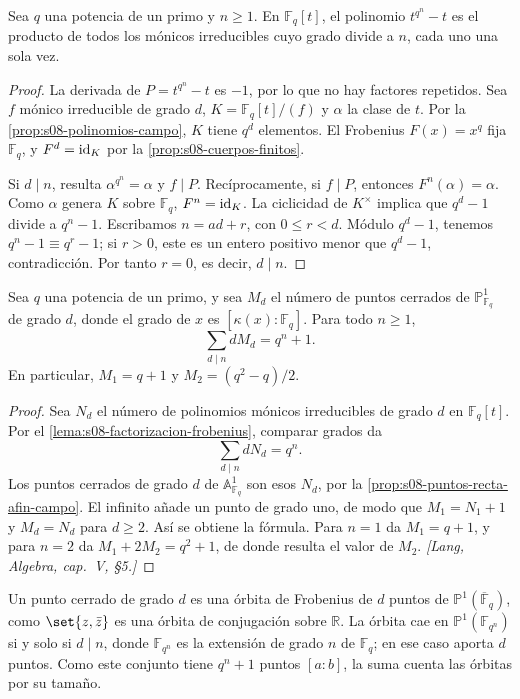 \begin{lema}[Factorización de $t^{q^n}-t$]
\label{lema:s08-factorizacion-frobenius}
Sea $q$ una potencia de un primo y $n\geq1$. En $\mathbb F_q[t]$, el polinomio $t^{q^n}-t$ es el producto de todos los mónicos irreducibles cuyo grado divide a $n$, cada uno una sola vez.
\end{lema}
\begin{proof}
La derivada de $P=t^{q^n}-t$ es $-1$, por lo que no hay factores repetidos. Sea $f$ mónico irreducible de grado $d$, $K=\mathbb F_q[t]/(f)$ y $\alpha$ la clase de $t$. Por la \cref{prop:s08-polinomios-campo}, $K$ tiene $q^d$ elementos. El Frobenius $F(x)=x^q$ fija $\mathbb F_q$, y $F^d=\operatorname{id}_K$ por la \cref{prop:s08-cuerpos-finitos}.

Si $d\mid n$, resulta $\alpha^{q^n}=\alpha$ y $f\mid P$. Recíprocamente, si $f\mid P$, entonces $F^n(\alpha)=\alpha$. Como $\alpha$ genera $K$ sobre $\mathbb F_q$, $F^n=\operatorname{id}_K$. La ciclicidad de $K^\times$ implica que $q^d-1$ divide a $q^n-1$. Escribamos $n=ad+r$, con $0\leq r<d$. Módulo $q^d-1$, tenemos $q^n-1\equiv q^r-1$; si $r>0$, este es un entero positivo menor que $q^d-1$, contradicción. Por tanto $r=0$, es decir, $d\mid n$.
\end{proof}

\begin{prop}
\label{prop:s08-puntos-cerrados-campo-finito}
Sea $q$ una potencia de un primo, y sea $M_d$ el número de puntos cerrados de $\mathbb P_{\mathbb F_q}^1$ de grado $d$, donde el grado de $x$ es $[\kappa(x):\mathbb F_q]$. Para todo $n\geq1$,
\[
\sum_{d\mid n}dM_d=q^n+1.
\]
En particular, $M_1=q+1$ y $M_2=(q^2-q)/2$.
\end{prop}
\begin{proof}
Sea $N_d$ el número de polinomios mónicos irreducibles de grado $d$ en $\mathbb F_q[t]$. Por el \cref{lema:s08-factorizacion-frobenius}, comparar grados da
\[
\sum_{d\mid n}dN_d=q^n.
\]
Los puntos cerrados de grado $d$ de $\mathbb A_{\mathbb F_q}^1$ son esos $N_d$, por la \cref{prop:s08-puntos-recta-afin-campo}. El infinito añade un punto de grado uno, de modo que $M_1=N_1+1$ y $M_d=N_d$ para $d\geq2$. Así se obtiene la fórmula. Para $n=1$ da $M_1=q+1$, y para $n=2$ da $M_1+2M_2=q^2+1$, de donde resulta el valor de $M_2$. \emph{[Lang, Algebra, cap.~V, \S5.]}
\end{proof}

\begin{obs}
\label{obs:s08-orbitas-frobenius}
Un punto cerrado de grado $d$ es una órbita de Frobenius de $d$ puntos de $\mathbb P^1(\overline{\mathbb F}_q)$, como $\set{z,\bar z}$ es una órbita de conjugación sobre $\mathbb R$. La órbita cae en $\mathbb P^1(\mathbb F_{q^n})$ si y solo si $d\mid n$, donde $\mathbb F_{q^n}$ es la extensión de grado $n$ de $\mathbb F_q$; en ese caso aporta $d$ puntos. Como este conjunto tiene $q^n+1$ puntos $[a:b]$, la suma cuenta las órbitas por su tamaño.
\end{obs}

